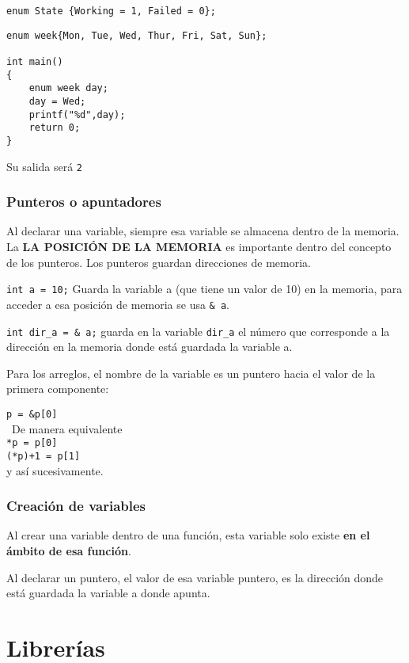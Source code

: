 \begin{verbatim}
enum State {Working = 1, Failed = 0}; 
\end{verbatim}


\begin{verbatim}
enum week{Mon, Tue, Wed, Thur, Fri, Sat, Sun};
  
int main()
{
    enum week day;
    day = Wed;
    printf("%d",day);
    return 0;
} 
\end{verbatim}

Su salida será \texttt{2}


\subsubsection{Punteros o apuntadores}

Al declarar una variable, siempre esa variable se almacena dentro de la memoria. La \textbf{LA POSICIÓN DE LA MEMORIA} es importante dentro del concepto de los punteros. Los punteros guardan direcciones de memoria. 

\texttt{int a = 10;} Guarda la variable a (que tiene un valor de 10) en la memoria, para acceder a esa posición de memoria se usa \texttt{\& a}.

\texttt{int dir\_a = \& a;} guarda en la variable \texttt{dir\_a} el número que corresponde a la dirección en la memoria donde está guardada la variable a.

Para los arreglos, el nombre de la variable es un puntero hacia el valor de la primera componente:

\texttt{p = \&p[0]} \\\
De manera equivalente \\
\texttt{*p = p[0]} \\
\texttt{(*p)+1 = p[1]} \\
y así sucesivamente.


\subsubsection{Creación de variables}

Al crear una variable dentro de una función, esta variable solo existe \textbf{en el ámbito de esa función}. 

Al declarar un puntero, el valor de esa variable puntero, es la dirección donde está guardada la variable a donde apunta.


\section*{Librerías}
